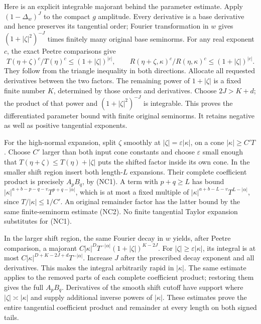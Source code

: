 \documentclass[
  11pt,
]{article}
\begin{document}
Here is an explicit integrable majorant behind the parameter estimate.
Apply \((1-\Delta_w)^J\) to the compact \(g\) amplitude. Every
derivative is a base derivative and hence preserves its tangential
order; Fourier transformation in \(w\) gives \((1+|\zeta|^2)^{-J}\)
times finitely many original base seminorms. For any real exponent
\(c\), the exact Peetre comparisons give \[
 T(\eta+\zeta)^c/T(\eta)^c\leq(1+|\zeta|)^{|c|},
 \qquad
 R(\eta+\zeta,\kappa)^c/R(\eta,\kappa)^c
     \leq(1+|\zeta|)^{|c|}.
 \tag{NC2}
\] They follow from the triangle inequality in both directions. Allocate
all requested derivatives between the two factors. The remaining power
of \(1+|\zeta|\) is a fixed finite number \(K\), determined by those
orders and derivatives. Choose \(2J>K+d\); the product of that power and
\((1+|\zeta|^2)^{-J}\) is integrable. This proves the differentiated
parameter bound with finite original seminorms. It retains negative as
well as positive tangential exponents.

For the high-normal expansion, split \(\zeta\) smoothly at
\(|\zeta|=\varepsilon|\kappa|\), on a cone \(|\kappa|\geq C'T\). Choose
\(C'\) larger than both input cone constants and choose \(\varepsilon\)
small enough that \(T(\eta+\zeta)\leq T(\eta)+|\zeta|\) puts the shifted
factor inside its own cone. In the smaller shift region insert both
length-\(L\) expansions. Their complete coefficient product is precisely
\(A_pB_q\), by (NC1). A term with \(p+q\geq L\) has bound
\(|\kappa|^{a+b-p-q-v}T^{p+q-|\alpha|}\), which is at most a fixed
multiple of \(|\kappa|^{a+b-L-v}T^{L-|\alpha|}\), since
\(T/|\kappa|\leq1/C'\). An original remainder factor has the latter
bound by the same finite-seminorm estimate (NC2). No finite tangential
Taylor expansion substitutes for (NC1).

In the larger shift region, the same Fourier decay in \(w\) yields,
after Peetre comparison, a majorant
\(C|\kappa|^D T^{-|\alpha|}(1+|\zeta|)^{K-2J}\). For
\(|\zeta|\geq\varepsilon|\kappa|\), its integral is at most
\(C|\kappa|^{D+K-2J+d}T^{-|\alpha|}\). Increase \(J\) after the
prescribed decay exponent and all derivatives. This makes the integral
arbitrarily rapid in \(|\kappa|\). The same estimate applies to the
removed parts of each complete coefficient product; restoring them gives
the full \(A_pB_q\). Derivatives of the smooth shift cutoff have support
where \(|\zeta|\asymp|\kappa|\) and supply additional inverse powers of
\(|\kappa|\). These estimates prove the entire tangential coefficient
product and remainder at every length on both signed tails.
\end{document}
